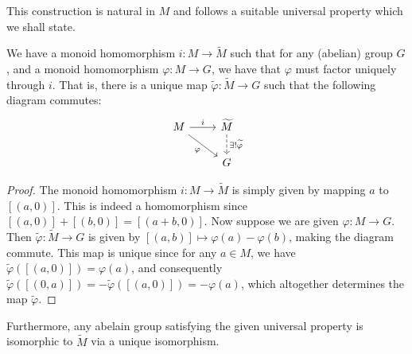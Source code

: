 This construction is natural in $M$ and follows a suitable universal property which we shall state. 

\begin{proposition}
  We have a monoid homomorphism $i : M \to \widetilde{M}$ such that for any (abelian) group $G$, and a monoid homomorphism $\varphi : M \to G$, we have that 
  $\varphi$ must factor uniquely through $i$. That is, there is a unique map $\widetilde{\varphi} : \widetilde{M} \to G$ such that the following diagram commutes:
  \[
  \begin{tikzcd}
    M \arrow[r, "i"] \arrow[dr, "\varphi"'] & \widetilde{M} \arrow[d, dashed, "\exists ! \widetilde{\varphi}"] \\
  & G 
  \end{tikzcd}
  \]
\end{proposition}
\begin{proof}
  The monoid homomorphism $i : M \to \widetilde{M}$ is simply given by mapping $a$ to $[(a,0)]$. This is indeed a homomorphism since $[(a,0)] + [(b,0)] = [(a+b,0)]$.
  Now suppose we are given $\varphi : M \to G$. Then $\widetilde{\varphi} : \widetilde{M} \to G$ is given by $[(a,b)] \mapsto \varphi(a) - \varphi(b)$, making the diagram commute.
  This map is unique since for any $a \in M$, we have $\widetilde{\varphi}([(a,0)]) = \varphi(a)$, and consequently $\widetilde{\varphi}([(0,a)]) = -\widetilde{\varphi}([(a,0)]) = - \varphi(a)$,
  which altogether determines the map $\widetilde{\varphi}$.
\end{proof}

Furthermore, any abelain group satisfying the given universal property is isomorphic to $\widetilde{M}$ via a unique isomorphism.

